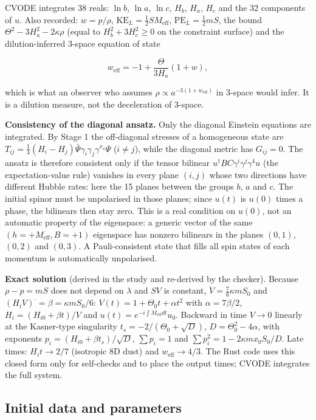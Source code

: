 \documentclass[11pt]{article}
\begin{document}
CVODE integrates 38 reals: $\ln b$, $\ln a$, $\ln c$, $H_b$, $H_a$, $H_c$ and the 32 components of $u$. Also recorded: $w=p/\rho$, $\mathrm{KE}_L=\tfrac12SM_{\mathrm{eff}}$, $\mathrm{PE}_L=\tfrac12mS$, the bound $\Theta^2-3H_a^2-2\kappa\rho$ (equal to $H_b^2+3H_c^2\ge0$ on the constraint surface) and the dilution-inferred 3-space equation of state

\[
w_{\mathrm{eff}}=-1+\frac{\Theta}{3H_a}(1+w),
\]

which is what an observer who assumes $\rho\propto a^{-3(1+w_{\mathrm{eff}})}$ in 3-space would infer. It is a dilution measure, not the deceleration of 3-space.

\textbf{Consistency of the diagonal ansatz.} Only the diagonal Einstein equations are integrated. By Stage 1 the off-diagonal stresses of a homogeneous state are $T_{ij}=\tfrac14(H_i-H_j)\bar\Psi\gamma_i\gamma_j\gamma^{x_4}\Psi$ ($i\ne j$), while the diagonal metric has $G_{ij}=0$. The ansatz is therefore consistent only if the tensor bilinear $u^\dagger BC\gamma^i\gamma^j\gamma^4u$ (the expectation-value rule) vanishes in every plane $(i,j)$ whose two directions have different Hubble rates: here the 15 planes between the groups $b$, $a$ and $c$. The initial spinor must be unpolarised in those planes; since $u(t)$ is $u(0)$ times a phase, the bilinears then stay zero. This is a real condition on $u(0)$, not an automatic property of the eigenspace: a generic vector of the same $(h=+M_{\mathrm{eff}},B=+1)$ eigenspace has nonzero bilinears in the planes $(0,1)$, $(0,2)$ and $(0,3)$. A Pauli-consistent state that fills all spin states of each momentum is automatically unpolarised.

\textbf{Exact solution} (derived in the study and re-derived by the checker). Because $\rho-p=mS$ does not depend on $\lambda$ and $SV$ is constant, $\ddot V=\tfrac76\kappa mS_0$ and $(H_iV)^{\cdot}=\beta=\kappa mS_0/6$: $V(t)=1+\Theta_0t+\alpha t^2$ with $\alpha=7\beta/2$, $H_i=(H_{i0}+\beta t)/V$ and $u(t)=e^{-i\int M_{\mathrm{eff}}dt}u_0$. Backward in time $V\to0$ linearly at the Kasner-type singularity $t_s=-2/(\Theta_0+\sqrt D)$, $D=\Theta_0^2-4\alpha$, with exponents $p_i=(H_{i0}+\beta t_s)/\sqrt D$, $\sum p_i=1$ and $\sum p_i^2=1-2\kappa mx_0S_0/D$. Late times: $H_it\to2/7$ (isotropic 8D dust) and $w_{\mathrm{eff}}\to4/3$. The Rust code uses this closed form only for self-checks and to place the output times; CVODE integrates the full system.

\subsection{Initial data and parameters}
\end{document}
